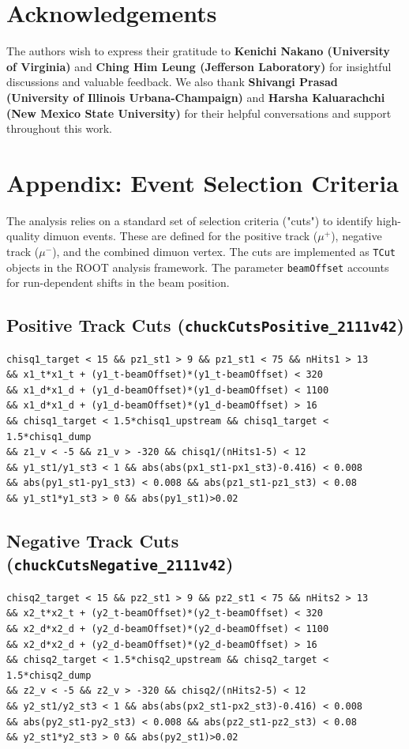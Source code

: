 \documentclass[11pt]{article}
\begin{document}
\section{Acknowledgements}
The authors wish to express their gratitude to \textbf{Kenichi Nakano (University of Virginia)} and \textbf{Ching Him Leung (Jefferson Laboratory)} for insightful discussions and valuable feedback. We also thank \textbf{Shivangi Prasad (University of Illinois Urbana-Champaign)} and \textbf{Harsha Kaluarachchi (New Mexico State University)} for their helpful conversations and support throughout this work.

\clearpage

\appendix
\section{Appendix: Event Selection Criteria}
\label{app:event_selection}

The analysis relies on a standard set of selection criteria ("cuts") to identify high-quality dimuon events. These are defined for the positive track ($\mu^+$), negative track ($\mu^-$), and the combined dimuon vertex. The cuts are implemented as \texttt{TCut} objects in the ROOT analysis framework. The parameter \texttt{beamOffset} accounts for run-dependent shifts in the beam position.

\subsection{Positive Track Cuts (\texttt{chuckCutsPositive\_2111v42})}
\label{cut:chuck_positive}
{\small\begin{verbatim}
chisq1_target < 15 && pz1_st1 > 9 && pz1_st1 < 75 && nHits1 > 13
&& x1_t*x1_t + (y1_t-beamOffset)*(y1_t-beamOffset) < 320
&& x1_d*x1_d + (y1_d-beamOffset)*(y1_d-beamOffset) < 1100
&& x1_d*x1_d + (y1_d-beamOffset)*(y1_d-beamOffset) > 16
&& chisq1_target < 1.5*chisq1_upstream && chisq1_target < 1.5*chisq1_dump
&& z1_v < -5 && z1_v > -320 && chisq1/(nHits1-5) < 12
&& y1_st1/y1_st3 < 1 && abs(abs(px1_st1-px1_st3)-0.416) < 0.008
&& abs(py1_st1-py1_st3) < 0.008 && abs(pz1_st1-pz1_st3) < 0.08
&& y1_st1*y1_st3 > 0 && abs(py1_st1)>0.02
\end{verbatim}}

\subsection{Negative Track Cuts (\texttt{chuckCutsNegative\_2111v42})}
\label{cut:chuck_negative}
{\small\begin{verbatim}
chisq2_target < 15 && pz2_st1 > 9 && pz2_st1 < 75 && nHits2 > 13
&& x2_t*x2_t + (y2_t-beamOffset)*(y2_t-beamOffset) < 320
&& x2_d*x2_d + (y2_d-beamOffset)*(y2_d-beamOffset) < 1100
&& x2_d*x2_d + (y2_d-beamOffset)*(y2_d-beamOffset) > 16
&& chisq2_target < 1.5*chisq2_upstream && chisq2_target < 1.5*chisq2_dump
&& z2_v < -5 && z2_v > -320 && chisq2/(nHits2-5) < 12
&& y2_st1/y2_st3 < 1 && abs(abs(px2_st1-px2_st3)-0.416) < 0.008
&& abs(py2_st1-py2_st3) < 0.008 && abs(pz2_st1-pz2_st3) < 0.08
&& y2_st1*y2_st3 > 0 && abs(py2_st1)>0.02
\end{verbatim}}
\end{document}
